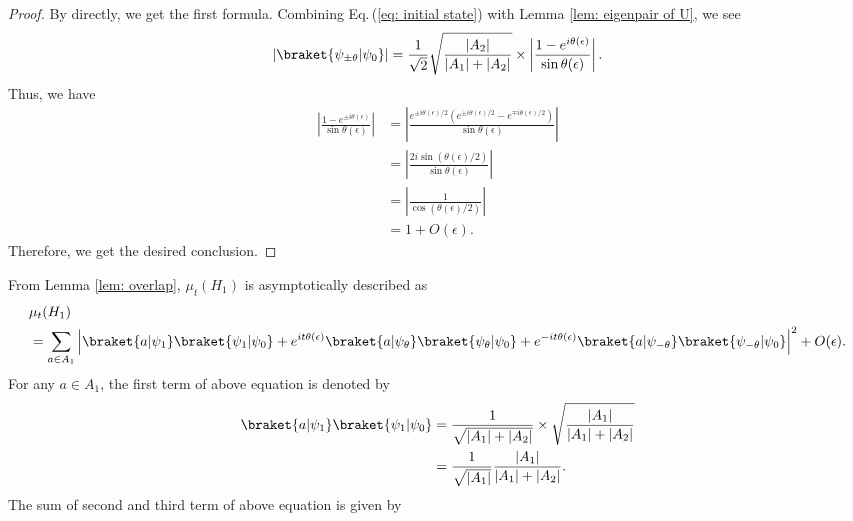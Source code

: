 \documentclass[12pt]{article}
\numberwithin{lemma}{section}
\numberwithin{proposition}{section}
\numberwithin{remark}{section}
\numberwithin{definition}{section}
\begin{document}
\begin{proof}
    By directly, we get the first formula. Combining Eq.\,(\ref{eq: initial state}) with Lemma \ref{lem: eigenpair of U}, we see
    \begin{align*}
        |\braket{\psi_{\pm \theta}|\psi_0}|=\frac{1}{\sqrt{2}}\sqrt{\frac{|A_2|}{|A_1|+|A_2|}}\times \left| \frac{1-e^{i\theta(\epsilon)}}{\sin \theta(\epsilon)}\right|.
    \end{align*}
    Thus, we have
    \begin{align*}
        \left| \frac{1-e^{\pm i\theta(\epsilon)}}{\sin \theta(\epsilon)}\right|
        &= \left|\frac{e^{\pm i\theta(\epsilon)/2}(e^{\pm i \theta(\epsilon)/2}-e^{\mp i \theta(\epsilon)/2})}{\sin \theta(\epsilon)} \right| \\
        &= \left|\frac{2i \sin (\theta(\epsilon)/2)}{\sin \theta(\epsilon)}\right| \\
        &= \left|\frac{1}{\cos (\theta(\epsilon)/2)} \right| \\
        &= 1+O(\epsilon).
    \end{align*}
    Therefore, we get the desired conclusion.
\end{proof}
From Lemma \ref{lem: overlap}, $\mu_{t}(H_1)$ is asymptotically described as
\begin{align*}
    &\mu_{t}(H_1) \\&=\sum_{a \in A_1}\left|\braket{a|\psi_1}\braket{\psi_1|\psi_0}+e^{it\theta(\epsilon)}\braket{a|\psi_{\theta}} \braket{\psi_{\theta}|\psi_0} +e^{-it\theta(\epsilon)}\braket{a|\psi_{-\theta}}\braket{\psi_{-\theta}|\psi_0}\right|^2+O(\epsilon).
\end{align*}
For any $a \in A_1$, the first term of above equation is denoted by
\begin{align*}
\braket{a|\psi_1}\braket{\psi_1|\psi_0}&=
    \frac{1}{\sqrt{|A_1|+|A_2|}}\times \sqrt{\frac{|A_1|}{|A_1|+|A_2|}} \\
    & =\frac{1}{\sqrt{|A_1|}}\frac{|A_1|}{|A_1|+|A_2|}.  \\
\end{align*}
The sum of second and third term of above equation is given by 
\end{document}
